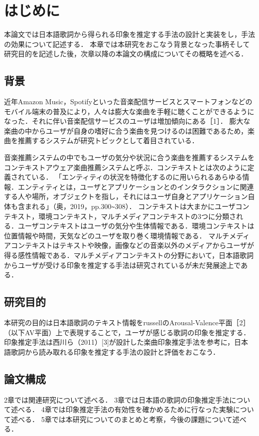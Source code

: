 \documentclass[a4paper,11pt,oneside,openany]{jsbook}
\begin{document}
\chapter{はじめに}
本論文では日本語歌詞から得られる印象を推定する手法の設計と実装をし，手法の効果について記述する．
本章では本研究をおこなう背景となった事柄そして研究目的を記述した後，次章以降の本論文の構成についてその概略を述べる．

\section{背景}
近年Amazon Music，Spotifyといった音楽配信サービスとスマートフォンなどのモバイル端末の普及により，人々は膨大な楽曲を手軽に聴くことができるようになった．それに伴い音楽配信サービスのユーザは増加傾向にある［1］．
膨大な楽曲の中からユーザが自身の嗜好に合う楽曲を見つけるのは困難であるため，楽曲を推薦するシステムが研究トピックとして着目されている．

音楽推薦システムの中でもユーザの気分や状況に合う楽曲を推薦するシステムをコンテキストアウェア楽曲推薦システムと呼ぶ．コンテキストとは次のように定義されている．
「エンティティの状況を特徴化するのに用いられるあらゆる情報．エンティティとは，ユーザとアプリケーションとのインタラクションに関連する人や場所，オブジェクトを指し，それにはユーザ自身とアプリケーション自体も含まれる」（奥，2019，pp.300\verb+~+308）．
コンテキストは大まかにユーザコンテキスト，環境コンテキスト，マルチメディアコンテキストの3つに分類される．ユーザコンテキストはユーザの気分や生体情報である．環境コンテキストは位置情報や時間，天気などのユーザを取り巻く環境情報である．
マルチメディアコンテキストはテキストや映像，画像などの音楽以外のメディアからユーザが得る感性情報である．マルチメディアコンテキストの分野において，日本語歌詞からユーザが受ける印象を推定する手法は研究されているが未だ発展途上である．
\section{研究目的}
本研究の目的は日本語歌詞のテキスト情報をrussellのArousal-Valence平面［2］（以下AV平面）上で表現することで，ユーザが感じる歌詞の印象を推定する．
印象推定手法は西川ら（2011）[3]が設計した楽曲印象推定手法を参考に，日本語歌詞から読み取れる印象を推定する手法の設計と評価をおこなう．

\section{論文構成}
2章では関連研究について述べる．
3章では日本語の歌詞の印象推定手法について述べる．
4章では印象推定手法の有効性を確かめるために行なった実験について述べる．
5章では本研究についてのまとめと考察，今後の課題について述べる．

%
\end{document}
